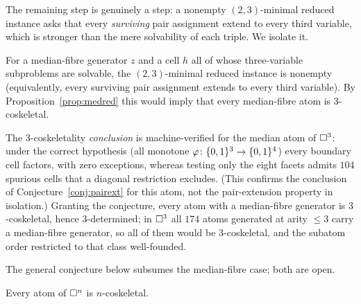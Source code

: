 The remaining step is genuinely a step: a nonempty $(2,3)$-minimal reduced
instance asks that every \emph{surviving} pair assignment extend to every
third variable, which is stronger than the mere solvability of each triple.
We isolate it.

\begin{conj}\label{conj:pairext}
  For a median-fibre generator $z$ and a cell $h$ all of whose
  three-variable subproblems are solvable, the $(2,3)$-minimal reduced
  instance is nonempty \textup{(}equivalently, every surviving pair
  assignment extends to every third variable\textup{)}.  By
  Proposition~\ref{prop:medred} this would imply that every median-fibre
  atom is $3$-coskeletal.
\end{conj}

\begin{rem}[evidence]\label{rem:medev}
  The $3$-coskeletality \emph{conclusion} is machine-verified for the
  median atom of $\square^3$: under the correct hypothesis \textup{(}all
  monotone $\varphi\colon\{0,1\}^3\to\{0,1\}^4$\textup{)} every boundary cell
  factors, with zero exceptions, whereas testing only the eight facets
  admits $104$ spurious cells that a diagonal restriction excludes.  (This
  confirms the conclusion of Conjecture~\ref{conj:pairext} for this atom,
  not the pair-extension property in isolation.)  Granting the conjecture,
  every
  atom with a median-fibre generator is $3$-coskeletal, hence
  $3$-determined; in $\square^3$ all $174$ atoms generated at arity $\le3$
  carry a median-fibre generator, so all of them would be $3$-coskeletal,
  and the subatom order restricted to that class well-founded.
\end{rem}

The general conjecture below subsumes the median-fibre case; both are open.

\begin{conj}[$n$-coskeletality]\label{conj:cosk}
  Every atom of $\square^n$ is $n$-coskeletal.
\end{conj}

